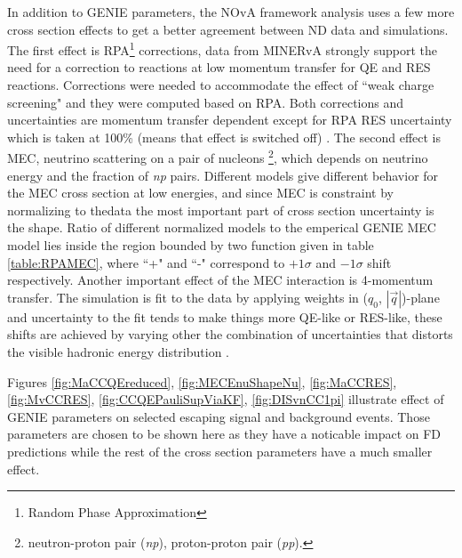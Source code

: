 In addition to GENIE parameters, the NOvA framework analysis uses a few more cross section effects to get a better agreement 
between ND data and simulations. The first effect is RPA\footnote{Random Phase Approximation} corrections, data from MINERvA 
\cite{MINERvA} strongly support the need for a correction to reactions at low momentum transfer for QE and RES reactions. 
Corrections were needed to accommodate the effect of ``weak charge screening" and they were computed based on RPA. Both corrections 
and uncertainties are momentum transfer dependent except for RPA RES uncertainty which is taken at 100\% (means that effect 
is switched off) \cite{Xsec2017_technote}. The second effect is MEC, neutrino scattering on a pair of nucleons
\footnote{neutron-proton pair (\textit{np}), proton-proton pair (\textit{pp}).}, which depends on neutrino energy and the fraction of 
\textit{np} pairs. Different models give different behavior for the MEC cross section at low energies, and since MEC is constraint 
by normalizing to thedata the most important part of cross section uncertainty is the shape. Ratio of different normalized models 
to the emperical GENIE MEC model lies inside the region bounded by two function given in table \ref{table:RPAMEC}, where ``+" and ``-" 
correspond to $+1\sigma$ and $-1\sigma$ shift respectively. Another important effect of the MEC interaction is 4-momentum transfer. 
The simulation is fit to the data by applying weights in ($q_0$, $|\vec{q}|$)-plane and uncertainty to the fit tends to make things 
more QE-like or RES-like, these shifts are achieved by varying other  the combination of uncertainties that distorts the visible 
hadronic energy distribution \cite{Xsec2018_technote}.

Figures \ref{fig:MaCCQEreduced}, \ref{fig:MECEnuShapeNu}, \ref{fig:MaCCRES}, \ref{fig:MvCCRES}, \ref{fig:CCQEPauliSupViaKF},
\ref{fig:DISvnCC1pi} illustrate effect of GENIE parameters on selected escaping signal and background events. Those parameters
are chosen to be shown here as they have a noticable impact on FD predictions while the rest of the cross section parameters
have a much smaller effect.

